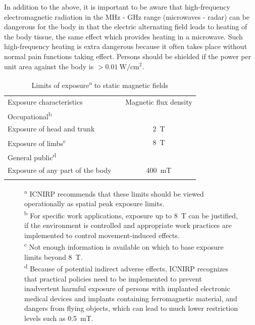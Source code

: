 \documentclass[../Elmag-labhefte-2020.tex]{subfiles}
\begin{document}
In addition to the above, it is important to be aware that high-frequency electromagnetic radiation in the \si{\mega\hertz} - \si{\giga\hertz} range (microwaves - radar) can be dangerous for the body in that the electric alternating field leads to heating of the body tissue, the same effect which provides heating in a microwave. Such high-frequency heating is extra dangerous because it often takes place without normal pain functions taking effect. Persons should be shielded if the power per unit area against the body is $> \SI{0,01}{\watt/\cm\squared}$.

\begin{table}[!ht]
    \begin{center}
    \caption{Limits of exposure\textsuperscript{a} to static magnetic fields}
    \label{tab:exposurlimits}
        \begin{tabular}{ l  c  c }
        \hline
        \noalign{\bigskip}
        \qquad\qquad Exposure characteristics &  & Magnetic flux density  \\
        \noalign{\medskip}
        \hline
        \noalign{\medskip}
        Occupational\textsuperscript{b} &  &  \\ 
        \noalign{\smallskip}
            \quad Exposure of head and trunk&   &  \SI{2}{\tesla} \\ 
            \quad Exposure of limbs\textsuperscript{c} & &  \SI{8}{\tesla}\\
        \noalign{\medskip}
        General public\textsuperscript{d} &  &  \\ 
        \quad Exposure of any part of the body& & \SI{400}{\milli\tesla}\\
        \noalign{\medskip}
        \hline
        \noalign{\medskip}
        \end{tabular}
    \end{center}
    \vspace*{-0.7cm}
\end{table}
%
\begin{figure}[!ht]
    \centering
    \begin{minipage}[t]{0.7\textwidth}
    \footnotesize{
        \textsuperscript{a} ICNIRP recommends that these limits should be viewed operationally as spatial peak exposure limits.\\
        \textsuperscript{b} For specific work applications, exposure up to \SI{8}{\tesla} can be justified, if the environment is controlled and appropriate work practices are implemented to control movement-induced effects.\\
        \textsuperscript{c} Not enough information is available on which to base exposure limits beyond \SI{8}{\tesla}.\\
        \textsuperscript{d} Because of potential indirect adverse effects, ICNIRP recognizes that practical policies need to be implemented to prevent inadvertent harmful exposure of persons with implanted electronic medical devices and implants containing ferromagnetic material, and dangers from flying objects, which can lead to much lower restriction levels such as \SI[output-decimal-marker = {.}]{0.5}{\milli\tesla}.
    }
    \end{minipage}
\end{figure}
\end{document}
